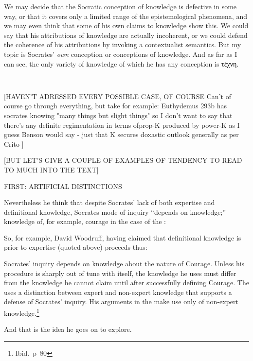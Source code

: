\documentclass[11pt,letterpaper,oneside]{amsart} %
\begin{document}






We may decide that the Socratic conception of knowledge is defective in some way, or that it covers only a limited range of the epistemological phenomena, and we may even think that some of his own claims to knowledge show this. We could say that his attributions of knowledge are actually incoherent, or we could defend the coherence of his attributions by invoking a contextualist semantics. But my topic is Socrates' \emph{own} conception or conceptions of knowledge. And as far as I can see, the only variety of knowledge of which he has any conception is τέχνη.


\




[HAVEN'T ADRESSED EVERY POSSIBLE CASE, OF COURSE Can't of course go through everything, but take for example:
Euthydemus 293b has socrates knowing "many things but slight things" so I don't want to say that there's any definite regimentation in terms ofprop-K produced by power-K as I guess Benson would say - just that K secures doxastic outlook generally as per Crito
]

[BUT LET'S GIVE A COUPLE OF EXAMPLES OF TENDENCY TO READ TO MUCH INTO THE TEXT]

FIRST: ARTIFICIAL DISTINCTIONS


Nevertheless he think that despite Socrates' lack of both expertise and definitional knowledge, Socrates mode of inquiry ``depends on knowledge;'' knowledge of, for example, courage in the case of the :

So, for example, David Woodruff, having claimed that definitional knowledge is prior to expertise (quoted above) proceeds thus:\begin{squote}Socrates' inquiry depends on knowledge about the nature of Courage. Unless his procedure is sharply out of tune with itself, the knowledge he uses must differ from the knowledge he cannot claim until after successfully defining Courage. The  uses a distinction between expert and non-expert knowledge that supports a defense of Socrates' inquiry. His arguments in the  make use only of non-expert knowledge.\footnote{Ibid.\ p\ 80}\end{squote} And that is the idea he goes on to explore.
\end{document}

